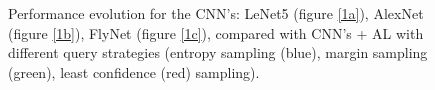 \documentclass[journal, a4paper]{IEEEtran}
\begin{document}
\begin{figure}[htpb]
{    }
    \caption{Performance evolution for the CNN's: LeNet5 (figure \ref{1a}), AlexNet (figure
    \ref{1b}), FlyNet (figure \ref{1c}), compared with CNN's + AL with different query 
    strategies (entropy sampling (blue), margin sampling (green), least confidence (red) sampling).}
    \label{ALP1} 
\end{figure}

\begin{figure}[htpb]
    \centering
    \hfill
    \hfill
\end{figure}
\end{document}
